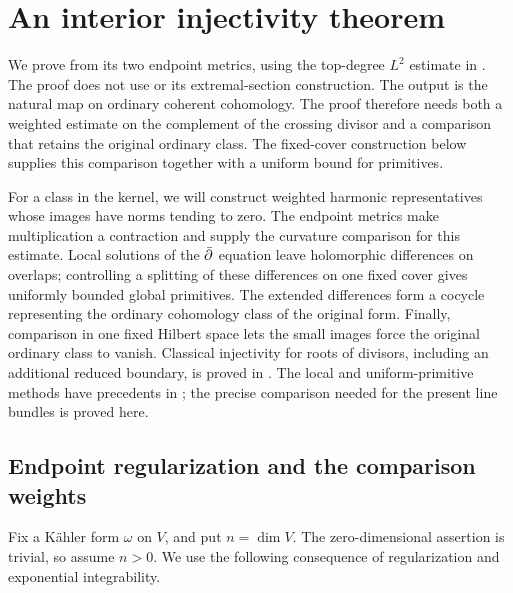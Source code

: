 \section{An interior injectivity theorem}
\label{sec:interior-injectivity}

We prove  from its two endpoint
metrics, using the top-degree $L^2$ estimate in
. The proof does not use
 or its extremal-section construction. The output is the natural map on ordinary coherent cohomology.
The proof therefore needs both a weighted estimate on the complement
of the crossing divisor and a comparison that retains the original
ordinary class. The fixed-cover construction below supplies this
comparison together with a uniform bound for primitives.

For a class in the kernel, we will construct weighted harmonic
representatives whose images have norms tending to zero. The endpoint
metrics make multiplication a contraction and supply the curvature
comparison for this estimate. Local solutions of the $\bar\partial$ equation
leave holomorphic differences on overlaps; controlling a splitting of
these differences on one fixed cover gives uniformly bounded global
primitives. The extended differences form a cocycle representing the
ordinary cohomology class of the original form. Finally, comparison in
one fixed Hilbert space lets the small images force the original
ordinary class to vanish.
Classical injectivity for roots of divisors, including an additional
reduced boundary, is proved in \cite[Theorem~5.1]{EsnaultViehweg1992}.
The local and uniform-primitive methods have precedents in
\cite[Sections~5.2--5.3]{Matsumura2018}; the precise comparison needed
for the present line bundles is proved here.

\subsection{Endpoint regularization and the comparison weights}

Fix a K\"ahler form $\omega$ on $V$, and put $n=\dim V$.  The
zero-dimensional assertion is trivial, so assume $n>0$.  We use the
following consequence of regularization and exponential integrability.



